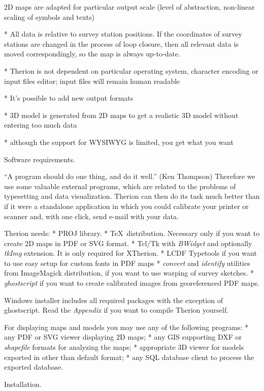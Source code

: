   2D maps are adapted for particular output scale (level of abstraction,
  non-linear scaling of symbols and texts)
  
* All data is relative to survey station positions. If the coordinates
  of survey stations are changed in the process of loop closure, then all relevant
  data is moved correspondingly, so the map is always up-to-date.

* Therion is not dependent on particular operating system, character encoding
  or input files editor; input files will remain human readable

* It's possible to add new output formats

* 3D model is generated from 2D maps to get a realistic 3D model 
  without entering too much data

* although the support for WYSIWYG is limited, you get what you want
\endlist

\subchapter Software requirements.

``A program should do one thing, and do it well.'' (Ken Thompson) 
Therefore we use some valuable external programs, which are related to the 
problems of typesetting and data visualization. Therion can then do its task 
much better than if it were a standalone application in which you could calibrate 
your printer or scanner and, with one click, send e-mail with your data.

Therion needs:
\list
* PROJ library.
* \TeX\ distribution.
  Necessary only if you want to create 2D maps in PDF or SVG format.
* Tcl/Tk with {\it BWidget} and optionally {\it tkImg} 
  extension. It is only required for XTherion.
* LCDF Typetools if you want to use easy setup for custom fonts in PDF maps
* {\it convert} and {\it identify} utilities from ImageMagick distribution, 
  if you want to use warping of survey sketches.
* {\it ghostscript} if you want to create calibrated images from georeferenced
  PDF maps.
\endlist

Windows installer includes all required packages with the exception of {ghostscript}. 
Read the {\it Appendix} if you want to compile Therion yourself.

For displaying maps and models you may use any of the following programs:
\list
* any PDF or SVG viewer displaying 2D maps;
* any GIS supporting DXF or {\it shapefile} formats for analyzing the maps;
* appropriate 3D viewer for models exported in other than default format;
* any SQL database client to process the exported database.
\endlist


\subchapter Installation.


